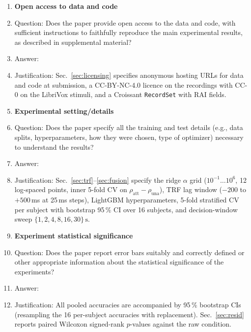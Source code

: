 \begin{enumerate}
\item {\bf Open access to data and code}
    \item[] Question: Does the paper provide open access to the data and code, with sufficient instructions to faithfully reproduce the main experimental results, as described in supplemental material?
    \item[] Answer: \answerYes{}
    \item[] Justification: Sec.~\ref{sec:licensing} specifies anonymous hosting URLs for data and code at submission, a CC-BY-NC-4.0 licence on the recordings with CC-0 on the LibriVox stimuli, and a Croissant \texttt{RecordSet} with RAI fields. 

\item {\bf Experimental setting/details}
    \item[] Question: Does the paper specify all the training and test details (e.g., data splits, hyperparameters, how they were chosen, type of optimizer) necessary to understand the results?
    \item[] Answer: \answerYes{}
    \item[] Justification: Sec.~\ref{sec:trf}--\ref{sec:fusion} specify the ridge $\alpha$ grid ($10^{-1}\ldots10^{6}$, 12 log-spaced points, inner 5-fold CV on $\rho_\text{att}-\rho_\text{una}$), TRF lag window ($-200$ to $+500$\,ms at 25\,ms steps), LightGBM hyperparameters, 5-fold stratified CV per subject with bootstrap 95\,\% CI over 16 subjects, and decision-window sweep $\{1,2,4,8,16,30\}\,\text{s}$.

\item {\bf Experiment statistical significance}
    \item[] Question: Does the paper report error bars suitably and correctly defined or other appropriate information about the statistical significance of the experiments?
    \item[] Answer: \answerYes{}
    \item[] Justification: All pooled accuracies are accompanied by 95\,\% bootstrap CIs (resampling the 16 per-subject accuracies with replacement). Sec.~\ref{sec:resid} reports paired Wilcoxon signed-rank $p$-values against the raw condition.


\end{enumerate}
